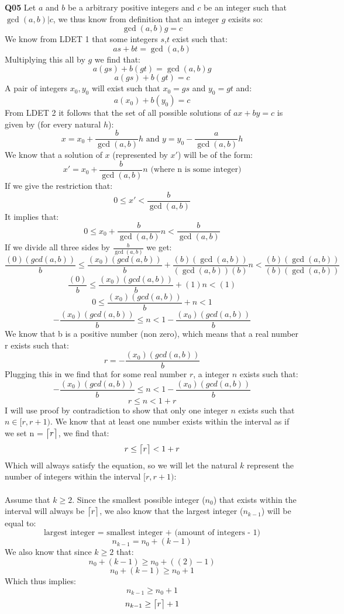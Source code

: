\documentclass[11pt]{article}
\DeclarePairedDelimiter{\ceil}{\lceil}{\rceil}
\begin{document}
\textbf{Q05} Let $a$ and $b$ be a arbitrary positive integers and $c$ be an integer such that $\gcd(a,b)|c$, we thus know from definition that an integer $g$ exisits so:
\[\gcd(a,b)g = c \]
We know from LDET 1 that some integers $s$,$t$ exist such that:
\[ as+bt = \gcd(a,b) \]
Multiplying this all by $g$ we find that:
\[ a(gs)+b(gt) = \gcd(a,b)g \]
\[ a(gs)+b(gt) = c\]
A pair of integers $x_0,y_0$ will exist such that $x_0 = gs$ and $y_0 = gt$ and:
\[ a(x_0)+b(y_0) = c\]
From LDET 2 it follows that the set of all possible solutions of $ax + by = c$ is given by (for every natural $h$):
\[ x = x_0 + \frac{b}{\gcd(a,b)}h \text{ and }  y = y_0 - \frac{a}{\gcd(a,b)}h \]
We know that a solution of $x$ (represented by $x'$) will be of the form:
\[ x' = x_0 + \frac{b}{\gcd(a,b)}n \text{ (where n is some integer)} \]
If we give the restriction that:
\[ 0\leq x'< \frac{b}{\gcd(a,b)}\]
It implies that:
\[ 0\leq x_0 + \frac{b}{\gcd(a,b)}n< \frac{b}{\gcd(a,b)}\]
If we divide all three sides by $\frac{b}{\gcd(a,b)}$ we get:
\[ \frac{(0)(gcd(a,b))}{b}\leq \frac{(x_0)(gcd(a,b))}{b}+ \frac{(b)(\gcd(a,b))}{(\gcd(a,b))(b)}n< \frac{(b)(\gcd(a,b))}{(b)(\gcd(a,b))}\]
\[ \frac{(0)}{b}\leq \frac{(x_0)(gcd(a,b))}{b}+ (1)n< (1)\]
\[ 0 \leq \frac{(x_0)(gcd(a,b))}{b}+ n< 1\]
\[ -\frac{(x_0)(gcd(a,b))}{b} \leq  n< 1 -\frac{(x_0)(gcd(a,b))}{b}\]
We know that b is a positive number (non zero), which means that a real number r exists such that:
\[ r = -\frac{(x_0)(gcd(a,b))}{b} \]
Plugging this in we find that for some real number $r$, a integer $n$ exists such that:
\[ -\frac{(x_0)(gcd(a,b))}{b} \leq  n< 1 -\frac{(x_0)(gcd(a,b))}{b}\]
\[r \leq  n < 1+ r\]
I will use proof by contradiction to show that only one integer $n$ exists such that $n \in [r,r+1)$. We know that at least one number exists within the interval as if we set n = $\ceil[\big]{r}$, we find that:
\[r \leq \ceil[\big]{r} < 1+ r\]
Which will always satisfy the equation, so we will let the natural $k$ represent the number of integers within the interval $[r,r+1)$:\\\\
Assume that $k\geq2$. Since the smallest possible integer ($n_0$) that exists within the interval will always be $\ceil[\big]{r}$, we also know that the largest integer ($n_{k-1}$) will be equal to:
\[ \text{largest integer = smallest integer + (amount of integers - 1)}\]
\[ n_{k-1} = n_0 + (k - 1)\]
We also know that since $k\geq2$ that:
\[ n_0 + (k - 1) \geq n_0 + ((2) - 1) \]
\[ n_0 + (k - 1) \geq n_0 + 1 \]
Which thus implies:
\[ n_{k-1} \geq n_0 + 1\]
\[ n_{k-1} \geq \ceil[\big]{r} + 1\]
\end{document}
